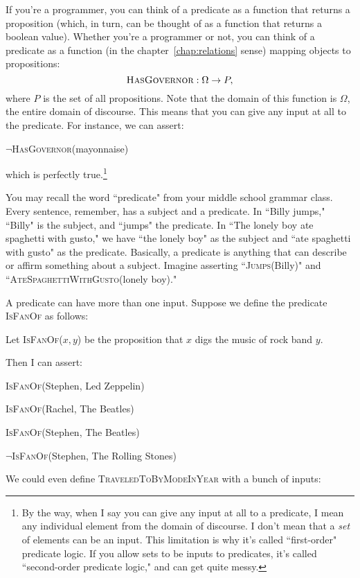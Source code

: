 If you're a programmer, you can think of a predicate as a function that
returns a proposition (which, in turn, can be thought of as a function
that returns a boolean value). Whether you're a programmer or not, you can think of a
predicate as a function (in the chapter~\ref{chap:relations} sense) mapping
objects to propositions:
\[
\textsc{HasGovernor} : \Omega \rightarrow P,
\]
where $P$ is the set of all propositions. Note that the domain of this
function is $\Omega$, the entire domain of discourse. This means that you
can give any input at all to the predicate. For instance, we can assert:
\begin{center}
$\neg$\textsc{HasGovernor}(mayonnaise)
\end{center}
which is perfectly true.\footnote{By the way, when I say you can give any
input at all to a predicate, I mean any individual element from the domain
of discourse. I don't mean that a \textit{set} of elements can be an input.
This limitation is why it's called ``first-order" predicate logic.  If you
allow sets to be inputs to predicates, it's called ``second-order predicate
logic," and can get quite messy.} 

You may recall the word ``predicate" from your middle school grammar class.
Every sentence, remember, has a subject and a predicate. In ``Billy jumps,"
``Billy" is the subject, and ``jumps" the predicate. In ``The lonely boy ate
spaghetti with gusto," we have ``the lonely boy" as the subject and ``ate
spaghetti with gusto" as the predicate. Basically, a predicate is anything that
can describe or affirm something about a subject. Imagine asserting
``\textsc{Jumps}(Billy)" and ``\textsc{AteSpaghettiWithGusto}(lonely boy)."

A predicate can have more than one input. Suppose we define the predicate
\textsc{IsFanOf} as follows:

\quad\quad Let \textsc{IsFanOf}($x,y$) be the proposition that $x$ digs the music of rock band $y$.

Then I can assert:
\begin{center}
\textsc{IsFanOf}(Stephen, Led Zeppelin)

\textsc{IsFanOf}(Rachel, The Beatles)

\textsc{IsFanOf}(Stephen, The Beatles)

$\neg$\textsc{IsFanOf}(Stephen, The Rolling Stones)
\end{center}
We could even define \textsc{TraveledToByModeInYear} with a bunch of inputs:

